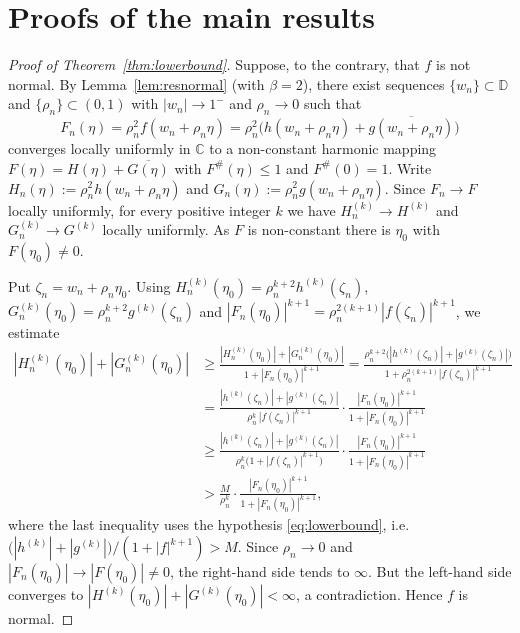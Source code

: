 \documentclass[10pt,a4paper]{amsart}
\newcommand{\D}{\mathbb{D}}
\newcommand{\C}{\mathbb{C}}
\begin{document}

\section{Proofs of the main results}

\begin{proof}[Proof of Theorem~\textup{\ref{thm:lowerbound}}]
Suppose, to the contrary, that $f$ is not normal. By Lemma~\ref{lem:resnormal} (with
$\beta=2$), there exist sequences $\{w_{n}\}\subset\D$ and $\{\rho_{n}\}\subset(0,1)$ with
$|w_{n}|\to1^{-}$ and $\rho_{n}\to0$ such that
\[
F_{n}(\eta)=\rho_{n}^{2}f(w_{n}+\rho_{n}\eta)
=\rho_{n}^{2}\big(h(w_{n}+\rho_{n}\eta)+\overline{g(w_{n}+\rho_{n}\eta)}\big)
\]
converges locally uniformly in $\C$ to a non-constant harmonic mapping
$F(\eta)=H(\eta)+\overline{G(\eta)}$ with $F^{\#}(\eta)\le1$ and $F^{\#}(0)=1$. Write
$H_{n}(\eta):=\rho_{n}^{2}h(w_{n}+\rho_{n}\eta)$ and
$G_{n}(\eta):=\rho_{n}^{2}g(w_{n}+\rho_{n}\eta)$. Since $F_{n}\to F$ locally uniformly, for
every positive integer $k$ we have $H_{n}^{(k)}\to H^{(k)}$ and $G_{n}^{(k)}\to G^{(k)}$
locally uniformly. As $F$ is non-constant there is $\eta_{0}$ with $F(\eta_{0})\neq0$.

Put $\zeta_{n}=w_{n}+\rho_{n}\eta_{0}$. Using
$H_{n}^{(k)}(\eta_{0})=\rho_{n}^{k+2}h^{(k)}(\zeta_{n})$,
$G_{n}^{(k)}(\eta_{0})=\rho_{n}^{k+2}g^{(k)}(\zeta_{n})$ and
$|F_{n}(\eta_{0})|^{k+1}=\rho_{n}^{2(k+1)}|f(\zeta_{n})|^{k+1}$, we estimate
\begin{align*}
|H_{n}^{(k)}(\eta_{0})|+|G_{n}^{(k)}(\eta_{0})|
&\ge\frac{|H_{n}^{(k)}(\eta_{0})|+|G_{n}^{(k)}(\eta_{0})|}{1+|F_{n}(\eta_{0})|^{k+1}}
=\frac{\rho_{n}^{k+2}\big(|h^{(k)}(\zeta_{n})|+|g^{(k)}(\zeta_{n})|\big)}
{1+\rho_{n}^{2(k+1)}|f(\zeta_{n})|^{k+1}}\\[0.4ex]
&=\frac{|h^{(k)}(\zeta_{n})|+|g^{(k)}(\zeta_{n})|}{\rho_{n}^{k}\,|f(\zeta_{n})|^{k+1}}\cdot
\frac{|F_{n}(\eta_{0})|^{k+1}}{1+|F_{n}(\eta_{0})|^{k+1}}\\[0.4ex]
&\ge\frac{|h^{(k)}(\zeta_{n})|+|g^{(k)}(\zeta_{n})|}{\rho_{n}^{k}\big(1+|f(\zeta_{n})|^{k+1}\big)}\cdot
\frac{|F_{n}(\eta_{0})|^{k+1}}{1+|F_{n}(\eta_{0})|^{k+1}}\\[0.4ex]
&>\frac{M}{\rho_{n}^{k}}\cdot\frac{|F_{n}(\eta_{0})|^{k+1}}{1+|F_{n}(\eta_{0})|^{k+1}},
\end{align*}
where the last inequality uses the hypothesis \eqref{eq:lowerbound}, i.e.\
$\big(|h^{(k)}|+|g^{(k)}|\big)/(1+|f|^{k+1})>M$. Since $\rho_{n}\to0$ and
$|F_{n}(\eta_{0})|\to|F(\eta_{0})|\neq0$, the right-hand side tends to $\infty$. But the
left-hand side converges to $|H^{(k)}(\eta_{0})|+|G^{(k)}(\eta_{0})|<\infty$, a
contradiction. Hence $f$ is normal.
\end{proof}
\end{document}
